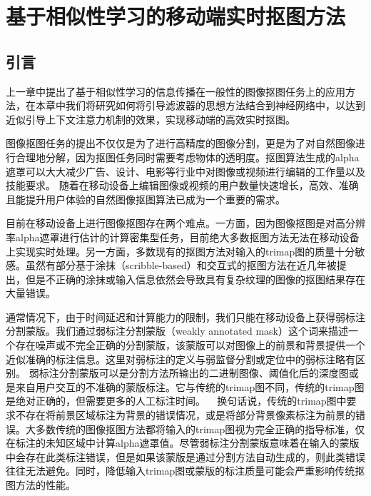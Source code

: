 \chapter{基于相似性学习的移动端实时抠图方法}
\section{引言}
上一章中提出了基于相似性学习的信息传播在一般性的图像抠图任务上的应用方法，在本章中我们将研究如何将引导滤波器的思想方法结合到神经网络中，以达到近似引导上下文注意力机制的效果，实现移动端的高效实时抠图。

图像抠图任务的提出不仅仅是为了进行高精度的图像分割，更是为了对自然图像进行合理地分解，因为抠图任务同时需要考虑物体的透明度。抠图算法生成的alpha遮罩可以大大减少广告、设计、电影等行业中对图像或视频进行编辑的工作量以及技能要求。
随着在移动设备上编辑图像或视频的用户数量快速增长，高效、准确且能提升用户体验的自然图像抠图算法已成为一个重要的需求。

目前在移动设备上进行图像抠图存在两个难点。一方面，因为图像抠图是对高分辨率alpha遮罩进行估计的计算密集型任务，目前绝大多数抠图方法\cite{levin2008closed,chen2013knn,cho2016natural,xu2017deep}无法在移动设备上实现实时处理。另一方面，多数现有的抠图方法对输入的trimap图的质量十分敏感。虽然有部分基于涂抹（scribble-based）\cite{lee2011nonlocal}和交互式\cite{yang2018active}的抠图方法在近几年被提出，但是不正确的涂抹或输入信息依然会导致具有复杂纹理的图像的抠图结果存在大量错误。

通常情况下，由于时间延迟和计算能力的限制，我们只能在移动设备上获得弱标注分割蒙版。我们通过弱标注分割蒙版（weakly annotated mask）这个词来描述一个存在噪声或不完全正确的分割蒙版，该蒙版可以对图像上的前景和背景提供一个近似准确的标注信息。这里对弱标注的定义与弱监督分割\cite{papandreou2015weakly}或定位\cite{oquab2015object}中的弱标注略有区别。
弱标注分割蒙版可以是分割方法所输出的二进制图像、阈值化后的深度图或是来自用户交互的不准确的蒙版标注。它与传统的trimap图不同，传统的trimap图是绝对正确的，但需要更多的人工标注时间。
  换句话说，传统的trimap图中要求不存在将前景区域标注为背景的错误情况，或是将部分背景像素标注为前景的错误。大多数传统的图像抠图方法都将输入的trimap图视为完全正确的指导标准，仅在标注的未知区域中计算alpha遮罩值。尽管弱标注分割蒙版意味着在输入的蒙版中会存在此类标注错误，但是如果该蒙版是通过分割方法自动生成的，则此类错误往往无法避免。同时，降低输入trimap图或蒙版的标注质量可能会严重影响传统抠图方法的性能。

